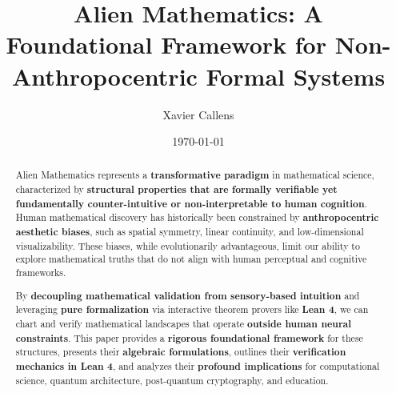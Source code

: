 \documentclass[11pt, a4paper]{article}
\title{Alien Mathematics: A Foundational Framework for Non-Anthropocentric Formal Systems}
\author{Xavier Callens}
\date{\today}
\begin{document}
\maketitle

\begin{abstract}
Alien Mathematics represents a \textbf{transformative paradigm} in mathematical science, characterized by \textbf{structural properties that are formally verifiable yet fundamentally counter-intuitive or non-interpretable to human cognition}. Human mathematical discovery has historically been constrained by \textbf{anthropocentric aesthetic biases}, such as spatial symmetry, linear continuity, and low-dimensional visualizability. These biases, while evolutionarily advantageous, limit our ability to explore mathematical truths that do not align with human perceptual and cognitive frameworks.

By \textbf{decoupling mathematical validation from sensory-based intuition} and leveraging \textbf{pure formalization} via interactive theorem provers like \textbf{Lean 4}, we can chart and verify mathematical landscapes that operate \textbf{outside human neural constraints}. This paper provides a \textbf{rigorous foundational framework} for these structures, presents their \textbf{algebraic formulations}, outlines their \textbf{verification mechanics in Lean 4}, and analyzes their \textbf{profound implications} for computational science, quantum architecture, post-quantum cryptography, and education.


\end{abstract}
\end{document}

